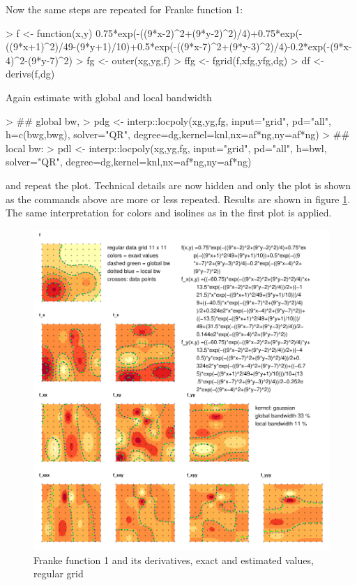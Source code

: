 \documentclass[nojss]{jss}
\begin{document}
Now the same steps are repeated for Franke function 1:
\begin{Schunk}
\begin{Sinput}
> f <- function(x,y) 0.75*exp(-((9*x-2)^2+(9*y-2)^2)/4)+0.75*exp(-((9*x+1)^2)/49-(9*y+1)/10)+0.5*exp(-((9*x-7)^2+(9*y-3)^2)/4)-0.2*exp(-(9*x-4)^2-(9*y-7)^2)
> fg  <- outer(xg,yg,f)
> ffg <- fgrid(f,xfg,yfg,dg)
> df  <- derivs(f,dg)
\end{Sinput}
\end{Schunk}
Again estimate with global and local bandwidth
\begin{Schunk}
\begin{Sinput}
> ## global bw,
> pdg <- interp::locpoly(xg,yg,fg, input="grid", pd="all", h=c(bwg,bwg), solver="QR", degree=dg,kernel=knl,nx=af*ng,ny=af*ng)
> ## local bw:
> pdl <- interp::locpoly(xg,yg,fg, input="grid", pd="all", h=bwl, solver="QR", degree=dg,kernel=knl,nx=af*ng,ny=af*ng)
\end{Sinput}
\end{Schunk}
and repeat the plot. Technical details are now hidden and only the
plot is shown as the commands above are more or less repeated.
Results are shown in figure \ref{fig:franke1}. The same interpretation for colors and isolines as in the first plot is applied.
\begin{figure}[htb]
\centering
\includegraphics{fig--028}
\caption{Franke function 1 and its derivatives, exact and estimated values, regular grid}
\label{fig:franke1}
\end{figure}
\end{document}
